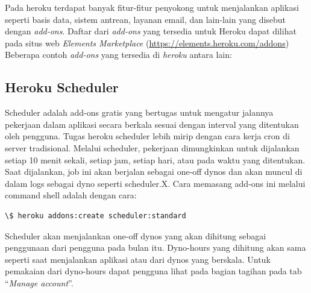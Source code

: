 Pada heroku terdapat banyak fitur-fitur penyokong untuk menjalankan aplikasi seperti basis data, sistem antrean, layanan email, dan lain-lain yang disebut dengan \textit{add-ons}. Daftar dari \textit{add-ons} yang tersedia untuk Heroku dapat dilihat pada situs web \textit{Elements Marketplace} (\url{https://elements.heroku.com/addons}) Beberapa contoh \textit{add-ons} yang tersedia di \textit{heroku} antara lain:

\subsection{Heroku Scheduler}
Scheduler adalah add-ons gratis yang bertugas untuk mengatur jalannya pekerjaan dalam aplikasi secara berkala sesuai dengan interval yang ditentukan oleh pengguna. Tugas heroku scheduler lebih mirip dengan cara kerja cron di server tradisional. Melalui scheduler, pekerjaan dimungkinkan untuk dijalankan setiap 10 menit sekali, setiap jam, setiap hari, atau pada waktu yang ditentukan. Saat dijalankan, job ini akan berjalan sebagai one-off dynos dan akan muncul di dalam logs sebagai dyno seperti scheduler.X. Cara memasang add-ons ini melalui command shell adalah dengan cara:
\begin{lstlisting}
\$ heroku addons:create scheduler:standard
\end{lstlisting}
Scheduler akan menjalankan one-off dynos yang akan dihitung sebagai penggunaan dari pengguna pada bulan itu. Dyno-hours yang dihitung akan sama seperti saat menjalankan aplikasi atau dari dynos yang berskala. Untuk pemakaian dari dyno-hours dapat pengguna lihat pada bagian tagihan pada tab ``\textit{Manage account}''. 


